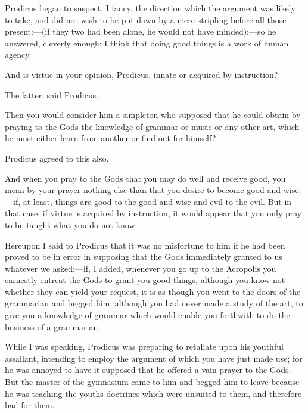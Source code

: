 \documentclass[11pt,letter]{article}
\begin{document}
\par  Prodicus began to suspect, I fancy, the direction which the argument was likely to take, and did not wish to be put down by a mere stripling before all those present:—(if they two had been alone, he would not have minded):—so he answered, cleverly enough: I think that doing good things is a work of human agency.

\par  And is virtue in your opinion, Prodicus, innate or acquired by instruction?

\par  The latter, said Prodicus.

\par  Then you would consider him a simpleton who supposed that he could obtain by praying to the Gods the knowledge of grammar or music or any other art, which he must either learn from another or find out for himself?

\par  Prodicus agreed to this also.

\par  And when you pray to the Gods that you may do well and receive good, you mean by your prayer nothing else than that you desire to become good and wise:—if, at least, things are good to the good and wise and evil to the evil. But in that case, if virtue is acquired by instruction, it would appear that you only pray to be taught what you do not know.

\par  Hereupon I said to Prodicus that it was no misfortune to him if he had been proved to be in error in supposing that the Gods immediately granted to us whatever we asked:—if, I added, whenever you go up to the Acropolis you earnestly entreat the Gods to grant you good things, although you know not whether they can yield your request, it is as though you went to the doors of the grammarian and begged him, although you had never made a study of the art, to give you a knowledge of grammar which would enable you forthwith to do the business of a grammarian.

\par  While I was speaking, Prodicus was preparing to retaliate upon his youthful assailant, intending to employ the argument of which you have just made use; for he was annoyed to have it supposed that he offered a vain prayer to the Gods. But the master of the gymnasium came to him and begged him to leave because he was teaching the youths doctrines which were unsuited to them, and therefore bad for them.
\end{document}
